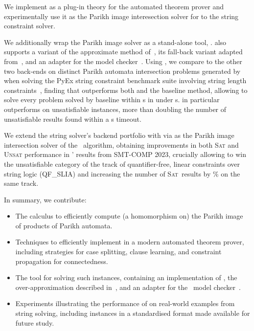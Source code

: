 We implement \Calculus{} as a plug-in theory for the \Princess{} automated
theorem prover and experimentally use it as the Parikh image interesection solver for
to the \Ostrich{} string constraint solver.

We additionally wrap the Parikh image solver as a stand-alone tool, \Catra{}.
\Catra{} also supports a variant of the approximate method of~\cite{approximate-parikh}, its fall-back variant adapted
from~\cite{generate-parikh-image}, and an adapter for the \Nuxmv{} model
checker~\cite{nuxmv}. Using \Catra, we compare \Calculus{} to the other two
back-ends on \NrBenchmarks{} distinct Parikh automata intersection problems
generated by \OstrichPlus{} when solving the PyEx string constraint benchmark
suite involving string length constraints~\cite{pyex}, finding that \Calculus{}
outperforms both \Nuxmv{} and the baseline method, allowing \Calculus{}
to solve every problem solved by baseline within s in under s.
\Calculus{} in particular outperforms \Nuxmv{} on unsatisfiable instances, more than 
doubling the number of unsatisfiable results found within a s timeout.

We extend the \Ostrich{} string solver's backend portfolio with \Calculus{} via
\Catra{} as the Parikh image intersection solver of the \OstrichPlus{}~algorithm,
obtaining improvements in both \textsc{Sat}  and \textsc{Unsat} performance in
\Ostrich{}' results from SMT-COMP 2023, crucially allowing \Ostrich{} to win
the unsatisfiable category of the track of quantifier-free, linear constraints
over string logic (QF\_SLIA) and increasing the number of \textsc{Sat}~results
by \% on the same track.



In summary, we contribute:
\begin{itemize}
    \item The \Calculus{} calculus to efficiently compute (a homomorphism on)
          the Parikh image of products of Parikh automata.
    \item Techniques to efficiently implement \Calculus{} in a modern
    automated theorem prover, including strategies for case splitting, clause
    learning, and constraint propagation for connectedness.
    \item The \Catra{} tool for solving such instances, containing an
    implementation of \Calculus{}, the over-approximation described
    in~\cite{approximate-parikh}, and an adapter for the~\Nuxmv{} model
    checker~\cite{nuxmv}.
    \item Experiments illustrating the performance of \Calculus{} on real-world
    examples from string solving, including \NrBenchmarks{} instances in a
    standardised format made available for future study.
\end{itemize}

